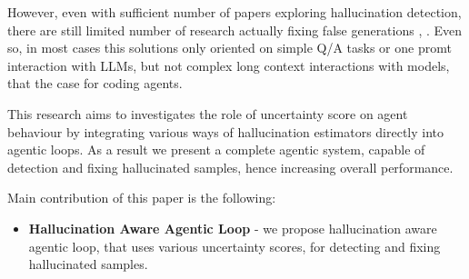 However, even with sufficient number of papers exploring hallucination detection, there are still limited
number of research actually fixing false generations \cite{andriushchenko2026efficient}, \cite{zhao-etal-2025-uncertainty}. Even so, in most cases this solutions only oriented
on simple Q/A tasks or one promt interaction with LLMs, but not complex long context interactions with models, that the case for coding agents.

This research aims to investigates the role of uncertainty score on agent behaviour by integrating various ways of
hallucination estimators directly into agentic loops. As a result we present a complete agentic system,
capable of detection and fixing hallucinated samples, hence increasing overall performance.

Main contribution of this paper is the following:
\begin{itemize}
    \item \textbf{Hallucination Aware Agentic Loop} - we propose hallucination aware agentic loop, that uses
    various uncertainty scores, for detecting and fixing hallucinated samples.
\end{itemize}

